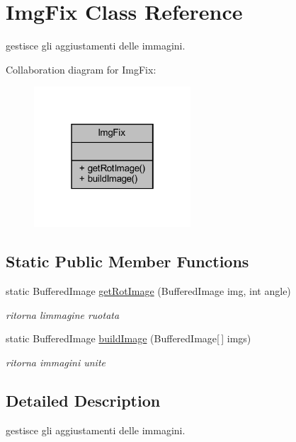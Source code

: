 \hypertarget{classhelpz_1_1_img_fix}{}\section{Img\+Fix Class Reference}
\label{classhelpz_1_1_img_fix}


gestisce gli aggiustamenti delle immagini.  




Collaboration diagram for Img\+Fix\+:\nopagebreak
\begin{figure}[H]
\begin{center}
\leavevmode
\includegraphics[width=166pt]{classhelpz_1_1_img_fix__coll__graph}
\end{center}
\end{figure}
\subsection*{Static Public Member Functions}
\begin{DoxyCompactItemize}
\item 
static Buffered\+Image \hyperlink{classhelpz_1_1_img_fix_aa29daa5edc91f3950ba54a6b2018a48b}{get\+Rot\+Image} (Buffered\+Image img, int angle)
\begin{DoxyCompactList}\small\item\em ritorna l\textquotesingle{}immagine ruotata \end{DoxyCompactList}\item 
static Buffered\+Image \hyperlink{classhelpz_1_1_img_fix_a1dabaa5ea503e0530b951a21811df80e}{build\+Image} (Buffered\+Image\mbox{[}$\,$\mbox{]} imgs)
\begin{DoxyCompactList}\small\item\em ritorna immagini unite \end{DoxyCompactList}\end{DoxyCompactItemize}


\subsection{Detailed Description}
gestisce gli aggiustamenti delle immagini. 

